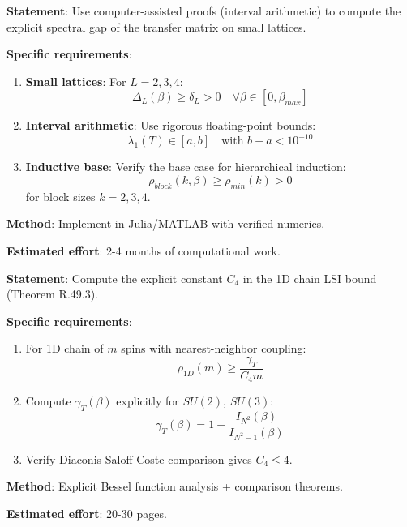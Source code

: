 \begin{verification}
\textbf{Statement}: Use computer-assisted proofs (interval arithmetic) to 
compute the explicit spectral gap of the transfer matrix on small lattices.

\textbf{Specific requirements}:
\begin{enumerate}
\item \textbf{Small lattices}: For $L = 2, 3, 4$:
\begin{equation}
\Delta_L(\beta) \geq \delta_L > 0 \quad \forall \beta \in [0, \beta_{max}]
\end{equation}

\item \textbf{Interval arithmetic}: Use rigorous floating-point bounds:
\begin{equation}
\lambda_1(T) \in [a, b] \quad \text{with } b - a < 10^{-10}
\end{equation}

\item \textbf{Inductive base}: Verify the base case for hierarchical induction:
\begin{equation}
\rho_{block}(k, \beta) \geq \rho_{min}(k) > 0
\end{equation}
for block sizes $k = 2, 3, 4$.
\end{enumerate}

\textbf{Method}: Implement in Julia/MATLAB with verified numerics.

\textbf{Estimated effort}: 2-4 months of computational work.
\end{verification}

\begin{verification}
\textbf{Statement}: Compute the explicit constant $C_4$ in the 1D chain 
LSI bound (Theorem R.49.3).

\textbf{Specific requirements}:
\begin{enumerate}
\item For 1D chain of $m$ spins with nearest-neighbor coupling:
\begin{equation}
\rho_{1D}(m) \geq \frac{\gamma_T}{C_4 m}
\end{equation}

\item Compute $\gamma_T(\beta)$ explicitly for $SU(2)$, $SU(3)$:
\begin{equation}
\gamma_T(\beta) = 1 - \frac{I_{N^2}(\beta)}{I_{N^2-1}(\beta)}
\end{equation}

\item Verify Diaconis-Saloff-Coste comparison gives $C_4 \leq 4$.
\end{enumerate}

\textbf{Method}: Explicit Bessel function analysis + comparison theorems.

\textbf{Estimated effort}: 20-30 pages.
\end{verification}


